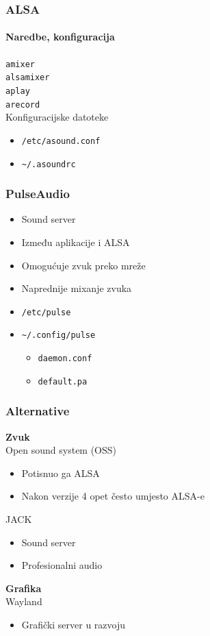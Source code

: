 \documentclass[t,table,usenames,dvipsnames]{beamer}
\begin{document}
\begin{frame}
	\frametitle{ALSA}
	\framesubtitle{Naredbe, konfiguracija}
	\texttt{amixer}\\
	\texttt{alsamixer}\\
	\vfill
	\texttt{aplay}\\
	\texttt{arecord}\\
	\vfill
	Konfiguracijske datoteke
	\begin{itemize}
		\item[] \texttt{/etc/asound.conf}
		\item[] \texttt{\textasciitilde/.asoundrc}
	\end{itemize}
	\vfill
\end{frame}


\begin{frame}
	\frametitle{PulseAudio}
	\begin{itemize}
		\item Sound server
		\item Između aplikacije i ALSA
	\end{itemize}
	\vfill
	\begin{itemize}
		\item Omogućuje zvuk preko mreže
		\item Naprednije mixanje zvuka
	\end{itemize}
	\vfill
	\begin{itemize}
		\item[] \texttt{/etc/pulse}
		\item[] \texttt{\textasciitilde/.config/pulse}
		\begin{itemize}
			\item[] \texttt{daemon.conf}
			\item[] \texttt{default.pa}
		\end{itemize}
	\end{itemize}
\end{frame}


\begin{frame}
	\frametitle{Alternative}
	\textbf{Zvuk}\\
	Open sound system (OSS)
	\begin{itemize}
		\item Potisnuo ga ALSA
		\item Nakon verzije 4 opet često umjesto ALSA-e
	\end{itemize}
	\vspace{1em}
	JACK
	\begin{itemize}
		\item Sound server
		\item Profesionalni audio
	\end{itemize}
	\vfill
	\textbf{Grafika}\\
	Wayland
	\begin{itemize}
		\item Grafički server u razvoju
	\end{itemize}
	
\end{frame}
\end{document}
